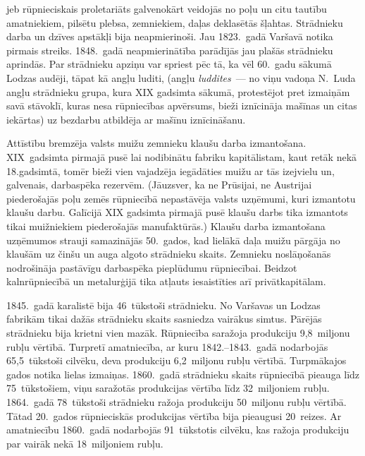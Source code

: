 \documentclass[twoside,a5paper,12pt,fleqn,openany]{extbook}
\newcommand{\entxti}[1]{\textit{\textenglish{#1}}}
\begin{document}
 jeb rūpnieciskais proletariāts galvenokārt veidojās no poļu un citu tautību amatniekiem, pilsētu plebsa, zemniekiem, daļas deklasētās šļahtas. Strādnieku darba un dzīves apstākļi bija neapmierinoši. Jau 1823.~gadā Varšavā notika pirmais streiks. 1848.~gadā neapmierinātība parādījās jau plašās strādnieku aprindās. Par strādnieku apziņu var spriest pēc tā, ka vēl 60.~gadu sākumā Lodzas audēji, tāpat kā angļu luditi, (angļu \entxti{luddites}~--- no viņu vadoņa N.~Luda angļu strādnieku grupa, kura XIX gadsimta sākumā, protestējot pret izmaiņām savā stāvoklī, kuras nesa rūpniecības apvērsums, bieži iznīcināja mašīnas un citas iekārtas) uz bezdarbu atbildēja ar mašīnu iznīcināšanu.

Attīstību bremzēja valsts muižu zemnieku klaušu darba izmantošana. XIX~gadsimta pirmajā pusē lai nodibinātu fabriku kapitālistam, kaut retāk nekā 18.gadsimtā, tomēr bieži vien vajadzēja iegādāties muižu ar tās izejvielu un, galvenais, darbaspēka rezervēm. (Jāuzsver, ka ne Prūsijai, ne Austrijai piederošajās poļu zemēs rūpniecībā nepastāvēja valsts uzņēmumi, kuri izmantotu klaušu darbu. Galīcijā XIX gadsimta pirmajā pusē klaušu darbs tika izmantots tikai muižniekiem piederošajās manufaktūrās.) Klaušu darba izmantošana uzņēmumos strauji samazinājās 50.~gados, kad lielākā daļa muižu pārgāja no klaušām uz činšu un auga algoto strādnieku skaits. Zemnieku noslāņošanās nodrošināja pastāvīgu darbaspēka pieplūdumu rūpniecībai. Beidzot kalnrūpniecībā un metalurģijā tika atļauts iesaistīties arī privātkapitālam.

1845.~gadā karalistē bija 46~tūkstoši strādnieku. No Varšavas un Lodzas fabrikām tikai dažās strādnieku skaits sasniedza vairākus simtus. Pārējās strādnieku bija krietni vien mazāk. Rūpniecība saražoja produkciju 9,8~miljonu rubļu vērtībā. Turpretī amatniecība, ar kuru 1842.--1843.~gadā nodarbojās 65,5~tūkstoši cilvēku, deva produkciju 6,2~miljonu rubļu vērtībā. Turpmākajos gados notika lielas izmaiņas. 1860.~gadā strādnieku skaits rūpniecībā pieauga līdz 75~tūkstošiem, viņu saražotās produkcijas vērtība līdz 32~miljoniem rubļu. 1864.~gadā 78~tūkstoši strādnieku ražoja produkciju 50~miljonu rubļu vērtībā. Tātad 20.~gados rūpnieciskās produkcijas vērtība bija pieaugusi 20~reizes. Ar amatniecību 1860.~gadā nodarbojās 91~tūkstotis cilvēku, kas ražoja produkciju par vairāk nekā 18~miljoniem rubļu.
\end{document}
